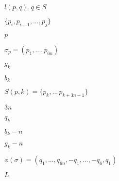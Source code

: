 \documentclass[10pt]{book}
\begin{document}
\begin{mdSnippets}
\begin{mdInlineSnippet}
$l(p,q), q \in S$\end{mdInlineSnippet}%
\begin{mdInlineSnippet}[634667029320bde7ca6fa92657535d2a]%
$\{p_{i},p_{i+1},...,p_{j}\}$\end{mdInlineSnippet}%
\begin{mdInlineSnippet}[83878c91171338902e0fe0fb97a8c47a]%
$p$\end{mdInlineSnippet}%
\begin{mdInlineSnippet}[a03fa66e851374baba3c205261a75df0]%
$\sigma_{p} = (p_{1},...,p_{6n})$\end{mdInlineSnippet}%
\begin{mdInlineSnippet}[f308942f585892c3a04ea80227c44cb0]%
$g_{k}$\end{mdInlineSnippet}%
\begin{mdInlineSnippet}[09f29221ff39b005c48d526b1f587ed3]%
$b_{k}$\end{mdInlineSnippet}%
\begin{mdInlineSnippet}%
$S(p,k) = \{p_{k},..,p_{k+3n-1}\}$\end{mdInlineSnippet}%
\begin{mdInlineSnippet}[fa7674a88b1ff1139a00caf969933a8c]%
$3n$\end{mdInlineSnippet}%
\begin{mdInlineSnippet}%
$q_{k}$\end{mdInlineSnippet}%
\begin{mdInlineSnippet}[717e8c4626a7ebf55d180b37950d21e4]%
$b_{k}-n$\end{mdInlineSnippet}%
\begin{mdInlineSnippet}[351600ab51876d720de82bf43f30e64b]%
$g_{k}-n$\end{mdInlineSnippet}%
\begin{mdInlineSnippet}[3643fe3ac19f33b933d90242f5d8bb9a]%
$\phi(\sigma) = (q_{1},...,q_{6n},-q_{1},...,-q_{6},q_{1})$\end{mdInlineSnippet}%
\begin{mdInlineSnippet}%
$L$\end{mdInlineSnippet}%
\begin{mdInlineSnippet}[7b8b965ad4bca0e41ab51de7b31363a1]%

\end{mdInlineSnippet}
\end{mdSnippets}
\end{document}

